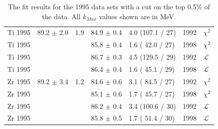 \begin{table}[h]
\begin{center}
\begin{tabular}{|l||l|l|l|l|l|l|}
      \hline
      Ti 1995 & 89.2 $\pm$ 2.0 & 1.9 & 84.9 $\pm$ 0.4 & 4.0 (107.1 / 27) & 1992 & $\chi^2$ \\
      Ti 1995 &                &     & 85.8 $\pm$ 0.4 & 1.6 ( 42.0 / 27) & 1998 & $\chi^2$ \\
      Ti 1995 &                &     & 86.7 $\pm$ 0.3 & 4.5 (129.5 / 29) & 1992 & $\mathcal{L}$ \\
      Ti 1995 &                &     & 86.4 $\pm$ 0.4 & 1.6 ( 45.1 / 29) & 1998 & $\mathcal{L}$ \\
      \hline
      Zr 1995 & 89.2 $\pm$ 3.4 & 1.2 & 84.6 $\pm$ 0.6 & 3.1 ( 84.5 / 27) & 1992 & $\chi^2$ \\
      Zr 1995 &                &     & 85.1 $\pm$ 0.6 & 1.7 ( 45.7 / 27) & 1998 & $\chi^2$ \\
      Zr 1995 &                &     & 86.2 $\pm$ 0.4 & 3.4 (100.6 / 30) & 1992 & $\mathcal{L}$ \\
      Zr 1995 &                &     & 85.8 $\pm$ 0.5 & 1.7 ( 51.4 / 30) & 1998 & $\mathcal{L}$ \\
      \hline
                                                                                
    \end{tabular}
  \end{center}
  \caption{The fit results for the 1995 data sets with a cut on the top 0.5\% of the data. All $k_{Max}$ values shown are in MeV.}
  \label{table:fits1995}
\end{table}


